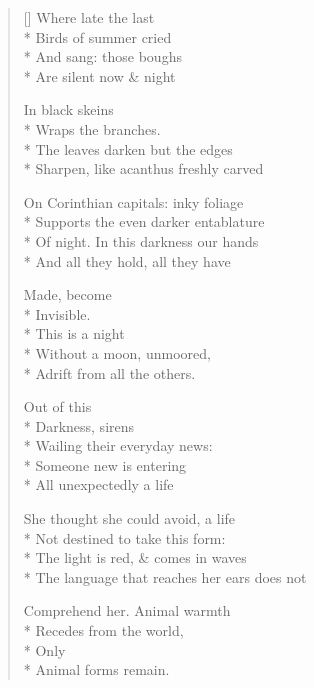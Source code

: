 \label{ch:out_of_this}
\settowidth{\versewidth}{                                         Out of this}
\begin{verse}[\versewidth]
Where late the last\\*
Birds of summer cried\\*
And sang: those boughs\\*
Are silent now \& night

In black skeins\\*
Wraps the branches.\\*
The leaves darken but the edges \\*
Sharpen, like acanthus freshly carved

On Corinthian capitals: inky foliage\\*
Supports the even darker entablature\\*
Of night. In this darkness our hands\\*
And all they hold, all they have

Made, become\\*
Invisible.\\*
                This is a night\\*
Without a moon, unmoored,\\*
Adrift from all the others.

                                         Out of this\\*
Darkness, sirens\\*
Wailing their everyday news:\\*
Someone new is entering\\*
All unexpectedly a life

She thought she could avoid, a life\\*
Not destined to take this form:\\*
The light is red, \& comes in waves\\*
The language that reaches her ears does not

Comprehend her.  Animal warmth\\*
Recedes from the world,\\*
Only\\*
Animal forms remain.
\end{verse}
